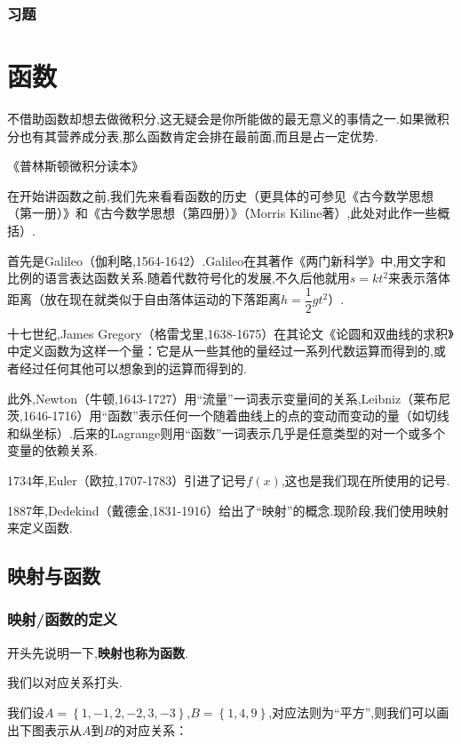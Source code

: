 \documentclass[lang=cn,math=cm,chinesefont=nofont,11pt,scheme=chinese,twocol]{elegantbook}
\begin{document}
\subsection{习题}

\chapter{函数}

\epigraph{不借助函数却想去做微积分,这无疑会是你所能做的最无意义的事情之一.如果微积分也有其营养成分表,那么函数肯定会排在最前面,而且是占一定优势.}{《普林斯顿微积分读本》}

在开始讲函数之前,我们先来看看函数的历史（更具体的可参见《古今数学思想（第一册）》和《古今数学思想（第四册）》（Morris Kiline著）,此处对此作一些概括）.

首先是Galileo（伽利略,1564-1642）.Galileo在其著作《两门新科学》中,用文字和比例的语言表达函数关系.随着代数符号化的发展,不久后他就用$s=kt^2$来表示落体距离（放在现在就类似于自由落体运动的下落距离$h=\dfrac{1}{2}gt^2$）.

十七世纪,James Gregory（格雷戈里,1638-1675）在其论文《论圆和双曲线的求积》中定义函数为这样一个量：它是从一些其他的量经过一系列代数运算而得到的,或者经过任何其他可以想象到的运算而得到的.

此外,Newton（牛顿,1643-1727）用“流量”一词表示变量间的关系,Leibniz（莱布尼茨,1646-1716）用“函数”表示任何一个随着曲线上的点的变动而变动的量（如切线和纵坐标）.后来的Lagrange则用“函数”一词表示几乎是任意类型的对一个或多个变量的依赖关系.

1734年,Euler（欧拉,1707-1783）引进了记号$f(x)$,这也是我们现在所使用的记号.

1887年,Dedekind（戴德金,1831-1916）给出了“映射”的概念.现阶段,我们使用映射来定义函数.

\section{映射与函数}

\subsection{映射/函数的定义}

开头先说明一下,\textbf{映射也称为函数}.

我们以对应关系打头.

\begin{example}\label{exp:map1}
  我们设$A=\left\{1,-1,2,-2,3,-3\right\}$,$B=\left\{1,4,9\right\}$,对应法则为“平方”,则我们可以画出下图表示从$A$到$B$的对应关系：
\end{example}
\end{document}
